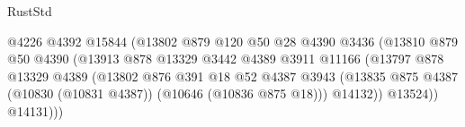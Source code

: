 \begin{lexlean}{RustStd}
\begin{coremodule}
                                                    @4226
                                                    @4392
                                                    @15844
                                                    (@13802
                                                      @879
                                                      @120
                                                      @50
                                                      @28
                                                      @4390
                                                      @3436
                                                      (@13810
                                                        @879
                                                        @50
                                                        @4390
                                                        (@13913
                                                          @878
                                                          @13329
                                                          @3442
                                                          @4389
                                                          @3911
                                                          @11166
                                                          (@13797
                                                            @878
                                                            @13329
                                                            @4389
                                                            (@13802
                                                              @876
                                                              @391
                                                              @18
                                                              @52
                                                              @4387
                                                              @3943
                                                              (@13835
                                                                @875
                                                                @4387
                                                                (@10830 (@10831 @4387))
                                                                (@10646 (@10836 @875 @18)))
                                                              @14132))
                                                          @13524))
                                                      @14131)))

\end{coremodule}
\end{lexlean}
